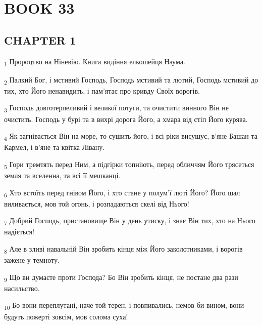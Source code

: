 \section{BOOK 33}
\subsection{CHAPTER 1}
\begin{tcolorbox}
\textsubscript{1} Пророцтво на Ніневію. Книга видіння елкошейця Наума.
\end{tcolorbox}
\begin{tcolorbox}
\textsubscript{2} Палкий Бог, і мстивий Господь, Господь мстивий та лютий, Господь мстивий до тих, хто Його ненавидить, і пам'ятає про кривду Своїх ворогів.
\end{tcolorbox}
\begin{tcolorbox}
\textsubscript{3} Господь довготерпеливий і великої потуги, та очистити винного Він не очистить. Господь у бурі та в вихрі дорога Його, а хмара від стіп Його курява.
\end{tcolorbox}
\begin{tcolorbox}
\textsubscript{4} Як загнівається Він на море, то сушить його, і всі ріки висушує, в'яне Башан та Кармел, і в'яне та квітка Лівану.
\end{tcolorbox}
\begin{tcolorbox}
\textsubscript{5} Гори тремтять перед Ним, а підгірки топніють, перед обличчям Його трясеться земля та вселенна, та всі її мешканці.
\end{tcolorbox}
\begin{tcolorbox}
\textsubscript{6} Хто встоїть перед гнівом Його, і хто стане у полум'ї люті Його? Його шал виливається, мов той огонь, і розпадаються скелі від Нього!
\end{tcolorbox}
\begin{tcolorbox}
\textsubscript{7} Добрий Господь, пристановище Він у день утиску, і знає Він тих, хто на Нього надіється!
\end{tcolorbox}
\begin{tcolorbox}
\textsubscript{8} Але в зливі навальній Він зробить кінця між Його заколотниками, і ворогів зажене у темноту.
\end{tcolorbox}
\begin{tcolorbox}
\textsubscript{9} Що ви думаєте проти Господа? Бо Він зробить кінця, не постане два рази насильство.
\end{tcolorbox}
\begin{tcolorbox}
\textsubscript{10} Бо вони переплутані, наче той терен, і повпивались, немов би вином, вони будуть пожерті зовсім, мов солома суха!
\end{tcolorbox}
